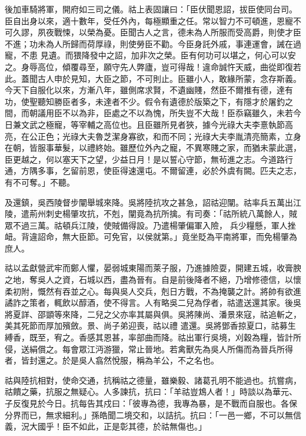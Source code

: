 \begin{pinyinscope}
 後加車騎將軍，開府如三司之儀。祜上表固讓曰：「臣伏聞恩詔，拔臣使同台司。臣自出身以來，適十數年，受任外內，每極顯重之任。常以智力不可頓進，恩寵不可久謬，夙夜戰悚，以榮為憂。臣聞古人之言，德未為人所服而受高爵，則使才臣不進；功未為人所歸而荷厚祿，則使勞臣不勸。今臣身託外戚，事連運會，誡在過寵，不患
 見遺。而猥降發中之詔，加非次之榮。臣有何功可以堪之，何心可以安之。身辱高位，傾覆尋至，願守先人弊廬，豈可得哉！違命誠忤天威，曲從即復若此。蓋聞古人申於見知，大臣之節，不可則止。臣雖小人，敢緣所蒙，念存斯義。今天下自服化以來，方漸八年，雖側席求賢，不遺幽賤，然臣不爾推有德，達有功，使聖聽知勝臣者多，未達者不少。假令有遺德於版築之下，有隱才於屠釣之間，而朝議用臣不以為非，臣處之不以為愧，所失豈不大哉！臣忝竊雖久，未若今日兼文武之極寵，等宰輔之高位也。且臣雖所見者狹，據今光祿大夫李憙執節高
 亮，在公正色；光祿大夫魯芝潔身寡欲，和而不同；光祿大夫李胤清亮簡素，立身在朝，皆服事華髮，以禮終始。雖歷位外內之寵，不異寒賤之家，而猶未蒙此選，臣更越之，何以塞天下之望，少益日月！是以誓心守節，無茍進之志。今道路行通，方隅多事，乞留前恩，使臣得速還屯。不爾留連，必於外虞有闕。匹夫之志，有不可奪。」不聽。



 及還鎮，吳西陵督步闡舉城來降。吳將陸抗攻之甚急，詔祜迎闡。祜率兵五萬出江陵，遣荊州刺史楊肇攻抗，不剋，闡竟為抗所擒。有司奏：「祜所統八萬餘人，賊眾不過三萬。祜頓兵江陵，使賊備得設。乃遣楊肇偏軍入險，
 兵少糧懸，軍人挫衄。背違詔命，無大臣節。可免官，以侯就第。」竟坐貶為平南將軍，而免楊肇為庶人。



 祜以孟獻營武牢而鄭人懼，晏弱城東陽而萊子服，乃進據險耍，開建五城，收膏腴之地，奪吳人之資，石城以西，盡為晉有。自是前後降者不絕，乃增修德信，以懷柔初附，慨然有吞並之心。每與吳人交兵，剋日方戰，不為掩襲之計。將帥有欲進譎詐之策者，輒飲以醇酒，使不得言。人有略吳二兒為俘者，祜遣送還其家。後吳將夏詳、邵顗等來降，二兒之父亦率其屬與俱。吳將陳尚、潘景來寇，祜追斬之，美其死節而厚加殯斂。景、尚子弟迎喪，祜以禮
 遣還。吳將鄧香掠夏口，祜募生縛香，既至，宥之。香感其恩甚，率部曲而降。祜出軍行吳境，刈穀為糧，皆計所侵，送絹償之。每會眾江沔游獵，常止晉地。若禽獸先為吳人所傷而為晉兵所得者，皆封還之。於是吳人翕然悅服，稱為羊公，不之名也。



 祜與陸抗相對，使命交通，抗稱祜之德量，雖樂毅、諸葛孔明不能過也。抗嘗病，祜饋之藥，抗服之無疑心。人多諫抗，抗曰：「羊祜豈鴆人者！」時談以為華元、子反復見於今日。抗每告其戍曰：「彼專為德，我專為暴，是不戰而自服也。各保分界而已，無求細利。」孫皓聞二境交和，以詰抗。抗曰：「一邑一鄉，不可以無信
 義，況大國乎！臣不如此，正是彰其德，於祜無傷也。」




\end{pinyinscope}
